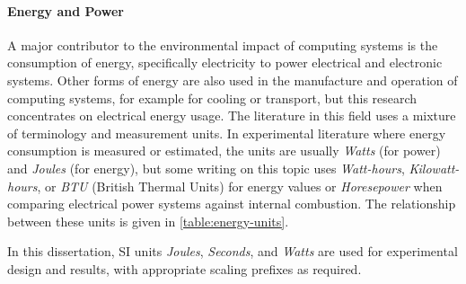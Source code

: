 \paragraph{Energy and Power}
\label{A58}
A major contributor to the environmental impact of computing systems is the consumption of energy, specifically electricity to power electrical and electronic systems. Other forms of energy are also used in the manufacture and operation of computing systems, for example for cooling or transport, but this research concentrates on electrical energy usage. The literature in this field uses a mixture of terminology and measurement units. In experimental literature where energy consumption is measured or estimated, the units are usually \emph{Watts} (for power) and \emph{Joules} (for energy), but some writing on this topic uses \emph{Watt-hours}, \emph{Kilowatt-hours}, or \emph{BTU} (British Thermal Units) for energy values or \emph{Horesepower} when comparing electrical power systems against internal combustion. The relationship between these units is given in \autoref{table:energy-units}.

\begin{leftbar}
In this dissertation, SI units \emph{Joules}, \emph{Seconds}, and \emph{Watts} are used for experimental design and results, with appropriate scaling prefixes as required.
\end{leftbar}

